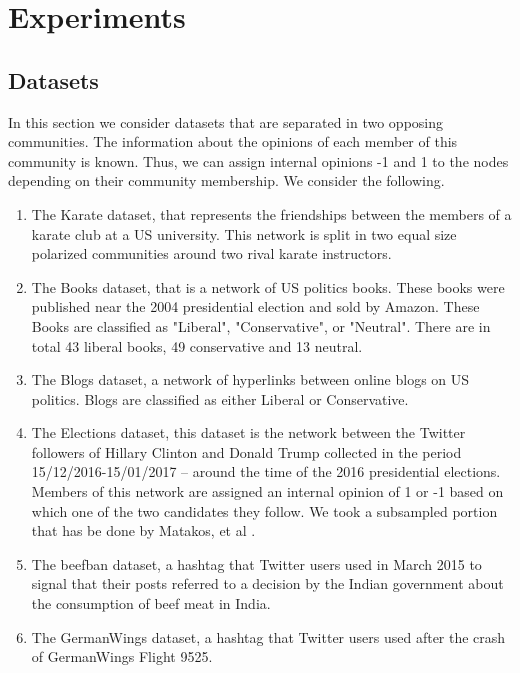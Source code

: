 \chapter{Experiments}
\label{ch:experiments}

\section{Datasets}
\label{sec:ds}

In this section we consider datasets that are separated in two opposing communities. The information about the opinions of each member of this community is known. Thus, we can assign internal opinions -1 and 1 to the nodes depending on their community membership\cite{tsapMatakosTerzi}.  We consider the following.

\begin{enumerate}

  \item The Karate dataset, that represents the friendships between the members of a karate club at a US university. This network is split in two equal size polarized communities around two rival karate instructors.
  
  \item The Books dataset, that is a network of US politics books. These books were published near the 2004 presidential election and sold by Amazon. These Books are classified as "Liberal", "Conservative", or "Neutral".  There are in total 43 liberal books, 49 conservative and 13 neutral.
  
  \item The Blogs dataset, a network of hyperlinks between online blogs on US politics. Blogs are classified as either Liberal or Conservative.
  
  \item The Elections dataset, this dataset is the network between the Twitter followers of Hillary Clinton and Donald Trump collected in the period 15/12/2016-15/01/2017 – around the time of the 2016 presidential elections. Members of this network are assigned an internal opinion of 1 or -1 based on which one of the two candidates they follow. We took a subsampled portion that has be done by Matakos, et al \cite{tsapMatakosTerzi}.
    
  \item The beefban dataset, a  hashtag that Twitter users used in March 2015 to signal that their posts referred to a decision by the Indian government about the consumption of beef meat in India.
  
  \item The GermanWings dataset, a  hashtag that Twitter users used after the crash of GermanWings Flight 9525.
  
\end{enumerate}


